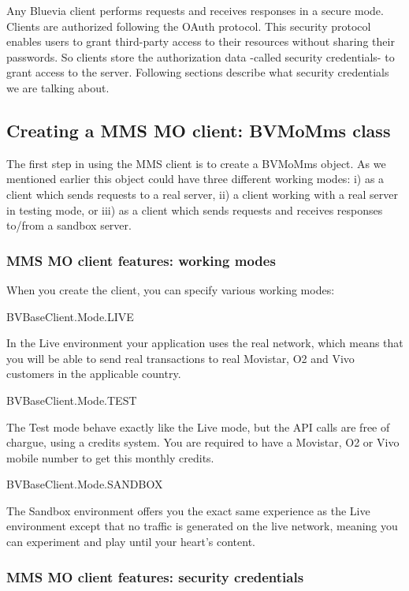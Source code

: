 Any Bluevia client performs requests and receives responses in a secure mode. Clients are authorized following the OAuth protocol. This security protocol enables users to grant third-\/party access to their resources without sharing their passwords. So clients store the authorization data -\/called security credentials-\/ to grant access to the server. Following sections describe what security credentials we are talking about.\hypertarget{blv_mms_mo_guide_creating_a_mms_mo_client_sec}{}\subsection{Creating a MMS MO client: BVMoMms class}\label{blv_mms_mo_guide_creating_a_mms_mo_client_sec}
The first step in using the MMS client is to create a BVMoMms object. As we mentioned earlier this object could have three different working modes: i) as a client which sends requests to a real server, ii) a client working with a real server in testing mode, or iii) as a client which sends requests and receives responses to/from a sandbox server.\hypertarget{blv_mms_mo_guide_mms_mo_client_features_working_modes_sec}{}\subsubsection{MMS MO client features: working modes}\label{blv_mms_mo_guide_mms_mo_client_features_working_modes_sec}
When you create the client, you can specify various working modes: 
\begin{DoxyItemize}
\item BVBaseClient.Mode.LIVE \par
In the Live environment your application uses the real network, which means that you will be able to send real transactions to real Movistar, O2 and Vivo customers in the applicable country.


\item BVBaseClient.Mode.TEST \par
The Test mode behave exactly like the Live mode, but the API calls are free of chargue, using a credits system. You are required to have a Movistar, O2 or Vivo mobile number to get this monthly credits.


\item BVBaseClient.Mode.SANDBOX \par
The Sandbox environment offers you the exact same experience as the Live environment except that no traffic is generated on the live network, meaning you can experiment and play until your heart’s content. 
\end{DoxyItemize}\hypertarget{blv_mms_mo_guide_mms_mo_client_features_security_credentials}{}\subsubsection{MMS MO client features: security credentials}\label{blv_mms_mo_guide_mms_mo_client_features_security_credentials}
